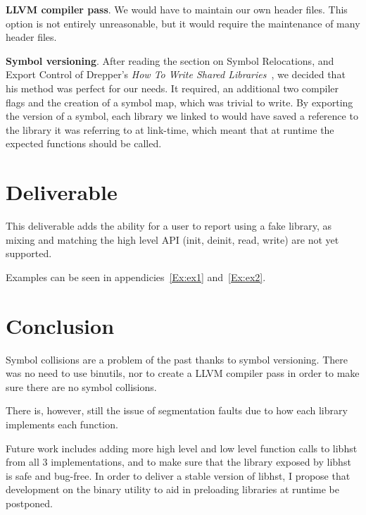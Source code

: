 \documentclass{acm_proc_article-sp}
\begin{document}
\textbf{LLVM compiler pass}. We would have to maintain our own header files.
This option is not entirely unreasonable, but it would require the maintenance
of many header files.

\textbf{Symbol versioning}. After reading the section on Symbol Relocations, and
Export Control of Drepper's
\textit{How To Write Shared Libraries}~\cite{howtodso}, we decided that his
method was perfect for our needs. It required, an additional two compiler flags
and the creation of a symbol map, which was trivial to write. By exporting the
version of a symbol, each library we linked to would have saved a reference to
the library it was referring to at link-time, which meant that at runtime the
expected functions should be called.

\section{Deliverable}\label{Sec:Deliv}

This deliverable adds the ability for a user to report using a fake library, as
mixing and matching the high level API (init, deinit, read, write) are not yet
supported.

Examples can be seen in appendicies~\ref{Ex:ex1} and~\ref{Ex:ex2}.

\section{Conclusion}

Symbol collisions are a problem of the past thanks to symbol versioning. There
was no need to use binutils, nor to create a LLVM compiler pass in order to make
sure there are no symbol collisions.

There is, however, still the issue of segmentation faults due to how each
library implements each function.

Future work includes adding more high level and low level function calls to
libhst from all 3 implementations, and to make sure that the library exposed by
libhst is safe and bug-free. In order to deliver a stable version of libhst, I
propose that development on the binary utility to aid in preloading libraries at
runtime be postponed.




\onecolumn
\newpage
\appendix
\end{document}
